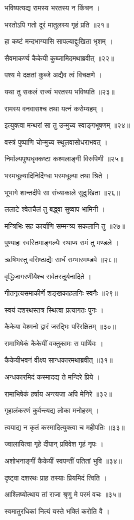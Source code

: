 भविष्यत्यद्य रामस्य भरतस्य न किंचन ।

भरतोऽपि गतो दूरं मातुलस्य गृहं प्रति ॥२१॥

हा कष्टं मन्दभाग्यासि सापल्याद्दुःखिता भृशम् ।

सैवमाकर्ण्य कैकेयी कुब्जामिदमथाब्रवीत् ॥२२॥

पश्य मे दक्षतां कुब्जे अद्यैव त्वं विचक्षणे ।

यथा तु सकलं राज्यं भरतस्य भविष्यति ॥२३॥

रामस्य वनवासश्च तथा यत्नं करोम्यहम् ।

इत्युक्त्वा मन्थरां सा तु उन्मुच्य स्वाङ्गभूषणम् ॥२४॥

वस्त्रं पुष्पाणि चोन्मुच्य स्थूलवासोधराभवत् ।

निर्माल्यपुष्पधृक्कष्टा कश्मलाङ्गी विरुपिणी ॥२५॥

भस्मधूल्यादिनिर्दिग्धा भस्मधूल्या तथा श्रिते ।

भूभागे शान्तदीपे सा संध्याकाले सुदुःखिता ॥२६॥

ललाटे श्वेतचैलं तु बद्ध्वा सुष्वाप भामिनी ।

मन्त्रिभिः सह कार्याणि सम्मन्त्र्य सकलानि तु ॥२७॥

पुण्याहः स्वस्तिमाङ्गल्यैः स्थाप्य रामं तु मण्डले ।

ऋषिभस्तु वसिष्ठाद्यैः सार्धं सम्भारमण्डपे ॥२८॥

वृद्धिजागरणीयैश्च सर्वतस्तूर्यनादिते ।

गीतनृत्यसमाकीर्णे शङ्खकाहलनिः स्वनैः ॥२९॥

स्वयं दशरथस्तत्र स्थित्वा प्रत्यागतः पुनः ।

कैकेया वेश्मनो द्वारं जरद्भिः परिरक्षितम् ॥३०॥

रामाभिषेकं कैकेयीं वक्तुकामः स पार्थिवः ।

कैकेयीभवनं वीक्ष्य सान्धकारमथाब्रवीत् ॥३१॥

अन्धकारमिदं कस्मादद्य ते मन्दिरे प्रिये ।

रामाभिषेकं हर्षाय अन्त्यजा अपि मेनिरे ॥३२॥

गृहालंकरणं कुर्वन्त्यद्य लोका मनोहरम् ।

त्वयाद्य न कृतं कस्मादित्युक्त्वा च महीपतिः ॥३३॥

ज्वालायित्वा गृहे दीपान् प्रविवेश गृहं नृपः ।

अशोभनाङ्गीं कैकेयीं स्वपन्तीं पतितां भुवि ॥३४॥

दृष्ट्वा दशरथः प्राह तस्याः प्रियमिदं त्विति ।

आश्लिष्योत्थाय तां राजा श्रृणु मे परमं वचः ॥३५॥

स्वमातुरधिकां नित्यं यस्ते भक्तिं करोति वै ।

